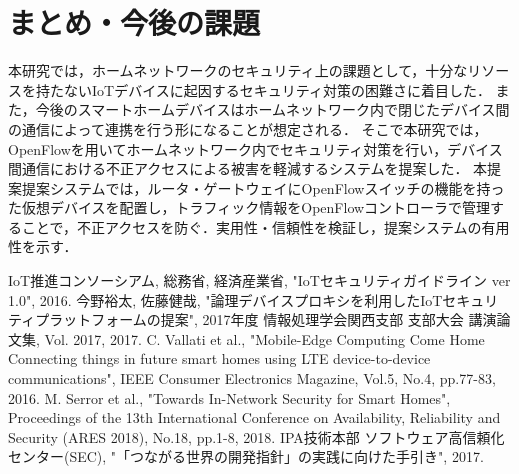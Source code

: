 \documentclass[a4paper,10pt,twocolumn,uplatex]{jsarticle}
\begin{document}
\section{まとめ・今後の課題}
本研究では，ホームネットワークのセキュリティ上の課題として，十分なリソースを持たないIoTデバイスに起因するセキュリティ対策の困難さに着目した．
また，今後のスマートホームデバイスはホームネットワーク内で閉じたデバイス間の通信によって連携を行う形になることが想定される．
そこで本研究では，OpenFlowを用いてホームネットワーク内でセキュリティ対策を行い，デバイス間通信における不正アクセスによる被害を軽減するシステムを提案した．
本提案提案システムでは，ルータ・ゲートウェイにOpenFlowスイッチの機能を持った仮想デバイスを配置し，トラフィック情報をOpenFlowコントローラで管理することで，不正アクセスを防ぐ．実用性・信頼性を検証し，提案システムの有用性を示す．

\footnotesize{
  \begin{thebibliography}{99}
     IoT推進コンソーシアム, 総務省, 経済産業省, "IoTセキュリティガイドライン ver 1.0", 2016.
     今野裕太, 佐藤健哉, "論理デバイスプロキシを利用したIoTセキュリティプラットフォームの提案", 2017年度 情報処理学会関西支部 支部大会 講演論文集, Vol. 2017, 2017.
     C. Vallati et al., "Mobile-Edge Computing Come Home Connecting things in future smart homes using LTE device-to-device communications", IEEE Consumer Electronics Magazine, Vol.5, No.4, pp.77-83, 2016.
     M. Serror et al., "Towards In-Network Security for Smart Homes", Proceedings of the 13th International Conference on Availability, Reliability and Security (ARES 2018), No.18, pp.1-8, 2018.
     IPA技術本部 ソフトウェア高信頼化センター(SEC), "「つながる世界の開発指針」の実践に向けた手引き", 2017.
  \end{thebibliography}
}

\end{document}
